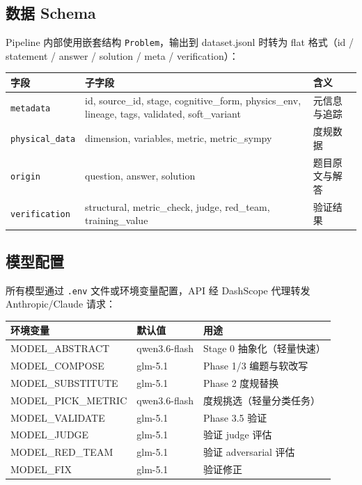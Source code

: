 \documentclass[11pt,a4paper]{article}
\begin{document}
\subsection{数据 Schema}

Pipeline 内部使用嵌套结构 \texttt{Problem}，输出到 dataset.jsonl 时转为 flat 格式（id / statement / answer / solution / meta / verification）：

\begin{table}[h]\centering\small
\begin{tabular}{llp{6cm}}
\toprule
\textbf{字段} & \textbf{子字段} & \textbf{含义} \\
\midrule
\texttt{metadata} & id, source\_id, stage, cognitive\_form, physics\_env, lineage, tags, validated, soft\_variant & 元信息与追踪 \\
\texttt{physical\_data} & dimension, variables, metric, metric\_sympy & 度规数据 \\
\texttt{origin} & question, answer, solution & 题目原文与解答 \\
\texttt{verification} & structural, metric\_check, judge, red\_team, training\_value & 验证结果 \\
\bottomrule
\end{tabular}
\end{table}

\subsection{模型配置}

所有模型通过 \texttt{.env} 文件或环境变量配置，API 经 DashScope 代理转发 Anthropic/Claude 请求：

\begin{table}[h]\centering\small
\begin{tabular}{lll}
\toprule
\textbf{环境变量} & \textbf{默认值} & \textbf{用途} \\
\midrule
MODEL\_ABSTRACT & qwen3.6-flash & Stage 0 抽象化（轻量快速） \\
MODEL\_COMPOSE & glm-5.1 & Phase 1/3 编题与软改写 \\
MODEL\_SUBSTITUTE & glm-5.1 & Phase 2 度规替换 \\
MODEL\_PICK\_METRIC & qwen3.6-flash & 度规挑选（轻量分类任务） \\
MODEL\_VALIDATE & glm-5.1 & Phase 3.5 验证 \\
MODEL\_JUDGE & glm-5.1 & 验证 judge 评估 \\
MODEL\_RED\_TEAM & glm-5.1 & 验证 adversarial 评估 \\
MODEL\_FIX & glm-5.1 & 验证修正 \\
\bottomrule
\end{tabular}
\end{table}
\end{document}
